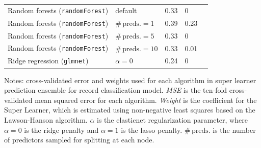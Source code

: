 \documentclass[hidelinks,12pt]{article}
\begin{document}
{\begin{appendices}
\begin{table}[h]
\begin{tabularx}{\linewidth}{l*{4}{Y}}
Random forests (\texttt{randomForest}) & default & 0.33 & 0 \\ 
Random forests (\texttt{randomForest})  & $\# \, \text{preds.} =1$ & 0.39 & 0.23 \\ 
Random forests (\texttt{randomForest})  & $\# \, \text{preds.} =5$  & 0.33 & 0 \\ 
Random forests (\texttt{randomForest})  & $\# \, \text{preds.} =10$ & 0.33 & 0.01 \\ 
Ridge regression (\texttt{glmnet}) &  $\alpha=0$ & 0.24 & 0 \\ 
   \hline
    \bottomrule
  \end{tabularx}
\footnotesize{{\color{red}Notes: cross-validated error and weights used for each algorithm in super learner prediction ensemble for record classification model. \textit{MSE} is the ten-fold cross-validated mean squared error for each algorithm. \textit{Weight} is the coefficient for the Super Learner, which is estimated using non-negative least squares based on the Lawson-Hanson algorithm. $\alpha$ is the elasticnet regularization parameter, where $\alpha = 0$ is the ridge penalty and $\alpha = 1$ is the lasso penalty. $\# \, \text{preds.}$ is the number of predictors sampled for splitting at each node.}}
\end{table}

\pagebreak


\end{appendices}}
\end{document}

